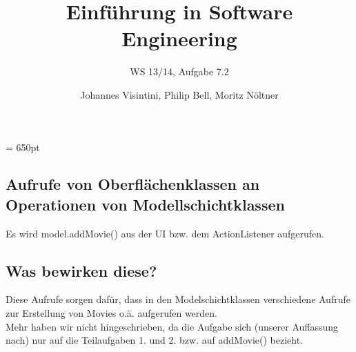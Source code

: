 \documentclass[ngerman]{scrartcl}
\begin{document}
\author{Johannes Visintini, Philip Bell, Moritz Nöltner}
\title{Einführung in Software Engineering}
\subtitle{WS 13/14, Aufgabe 7.2}
\maketitle

\textheight = 650pt

\subsection*{Aufrufe von Oberflächenklassen an Operationen von Modellschichtklassen}
Es wird model.addMovie() aus der UI bzw. dem ActionListener aufgerufen.

\subsection*{Was bewirken diese?}

Diese Aufrufe sorgen dafür, dass in den Modelschichtklassen verschiedene Aufrufe zur Erstellung von Movies o.ä. aufgerufen werden.\\

Mehr haben wir nicht hingeschrieben, da die Aufgabe sich (unserer Auffassung nach) nur auf die Teilaufgaben 1. und 2. bzw. auf addMovie() bezieht.
\end{document}
